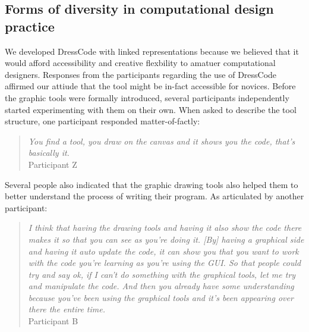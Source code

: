 \documentclass{sigchi}
\begin{document}
\subsection{Forms of diversity in computational design practice}
We developed DressCode with linked representations because we believed that it would afford accessibility and creative flexbility to amatuer computational designers. Responses from the participants regarding the use of DressCode affirmed our attiude that the tool might be in-fact accessible for novices. Before the graphic tools were formally introduced, several participants independently started experimenting with them on their own.  When asked to describe the tool structure, one participant responded matter-of-factly:
\begin{quotation}
\textit{You find a tool, you draw on the canvas and it shows you the code, that's basically it.}
\\Participant Z
\end{quotation}
Several people also indicated that the graphic drawing tools also helped them to better understand the process of writing their program. As articulated by another participant:
\begin{quotation}
\textit{I think that having the drawing tools and having it also show the code there makes it so that you can see as you're doing it. [By] having a graphical side and having it auto update the code, it can show you that you want to work with the code you're learning as you're using the GUI. So that people could try and say ok, if I can't do something with the graphical tools, let me try and manipulate the code. And then you already have some understanding because you've been using the graphical tools and it's been appearing over there the entire time.}
\\Participant B
\end{quotation}
\end{document}
